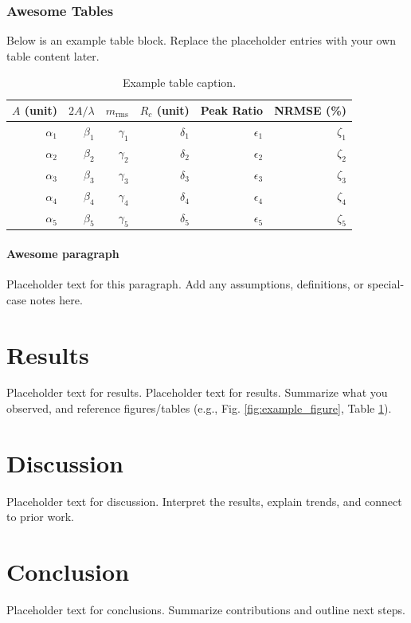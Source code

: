 \documentclass{geoheatdeliverable}
\begin{document}
\subsubsection{Awesome Tables}
Below is an example table block. Replace the placeholder entries with your own table content later.

\begin{table}[htbp]
\centering
\caption{Example table caption.}
\label{tab:example_table}
\begin{tabular}{rrrrrr}
\toprule
$A$ (unit) & $2A/\lambda$ & $m_{\mathrm{rms}}$ & $R_c$ (unit) & Peak Ratio & NRMSE (\%) \\
\midrule
$\alpha_1$ & $\beta_1$ & $\gamma_1$ & $\delta_1$ & $\epsilon_1$ & $\zeta_1$ \\
$\alpha_2$ & $\beta_2$ & $\gamma_2$ & $\delta_2$ & $\epsilon_2$ & $\zeta_2$ \\
$\alpha_3$ & $\beta_3$ & $\gamma_3$ & $\delta_3$ & $\epsilon_3$ & $\zeta_3$ \\
$\alpha_4$ & $\beta_4$ & $\gamma_4$ & $\delta_4$ & $\epsilon_4$ & $\zeta_4$ \\
$\alpha_5$ & $\beta_5$ & $\gamma_5$ & $\delta_5$ & $\epsilon_5$ & $\zeta_5$ \\
\bottomrule
\end{tabular}
\end{table}

\paragraph{Awesome paragraph}
Placeholder text for this paragraph. Add any assumptions, definitions, or special-case notes here.

\section{Results}
Placeholder text for results. Placeholder text for results. Summarize what you observed, and reference figures/tables (e.g., Fig. \ref{fig:example_figure}, Table \ref{tab:example_table}).

\section{Discussion}
Placeholder text for discussion. Interpret the results, explain trends, and connect to prior work.

\section{Conclusion}
Placeholder text for conclusions. Summarize contributions and outline next steps.



\makegeoheatimprint

\makegeoheatliabilityclaim
\end{document}
